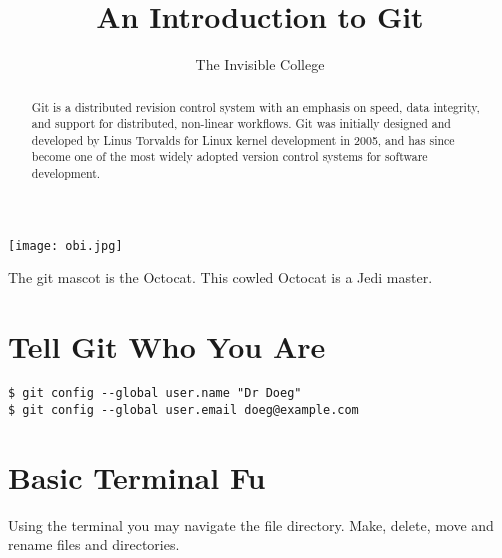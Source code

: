 \documentclass{tufte-handout}
\title{An Introduction to Git}
\author[Dr. Doeg]{The Invisible College}
\begin{document}
\maketitle%
\begin{marginfigure}%
  \texttt{[image: obi.jpg]}
  \caption{The git mascot is the Octocat.  This cowled Octocat is a Jedi master.}
  \label{fig:marginfig}
\end{marginfigure}
\begin{abstract}
\noindent
Git is a distributed revision control system with an emphasis on speed, data integrity, and support for distributed, non-linear workflows.  Git was initially designed and developed by Linus Torvalds for Linux kernel development in 2005, and has since become one of the most widely adopted version control systems for software development.
\end{abstract}

\vspace{1cm}
\normalsize
\section{Tell Git Who You Are}

\begin{shaded}
\begin{verbatim}
$ git config --global user.name "Dr Doeg"
$ git config --global user.email doeg@example.com
\end{verbatim}
\end{shaded}

\vspace{1cm}

\section{Basic Terminal Fu }

Using the terminal you may navigate the file directory.  Make, delete, move and rename files and directories. 
\end{document}
